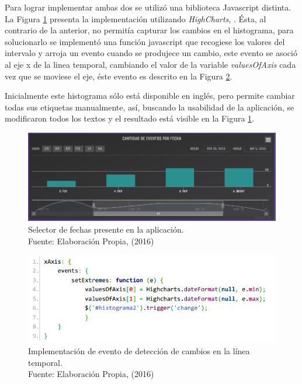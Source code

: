 Para lograr implementar ambas dos se utilizó una biblioteca Javascript distinta. La Figura \ref{fig:HistogramaFinal} presenta la implementación utilizando \textit{HighCharts}, \cite{Highcharts}. Ésta, al contrario de la anterior, no permitía capturar los cambios en el histograma, para solucionarlo se implementó una función javascript que recogiese los valores del intervalo y arroja un evento cuando se produjece un cambio, este evento se asoció al eje x de la linea temporal, cambiando el valor de la variable \textit{valuesOfAxis} cada vez que se moviese el eje, éste evento es descrito en la Figura \ref{fig:implementacionCambiosEnEje}.

Inicialmente este histograma sólo está disponible en inglés, pero permite cambiar todas sus etiquetas manualmente, así, buscando la usabilidad de la aplicación, se modificaron todos los textos y el resultado está visible en la Figura \ref{fig:HistogramaFinal}.

\begin{figure}[H]
	\centering
	\captionsetup{justification=centering}
	\includegraphics[scale=0.6]{images/Histograma.png}
	\caption[Selector de fechas presente en la aplicación.]{Selector de fechas presente en la aplicación.\\Fuente: Elaboración Propia, (2016)}
	\label{fig:HistogramaFinal}
\end{figure}

\begin{figure}[H]
	\centering
	\captionsetup{justification=centering}
	\includegraphics[scale=0.8]{images/onChangeEventTimeline.png}
	\caption[Implementación de evento de detección de cambios en la línea temporal.]{Implementación de evento de detección de cambios en la línea temporal.\\Fuente: Elaboración Propia, (2016)}
	\label{fig:implementacionCambiosEnEje}
\end{figure}

